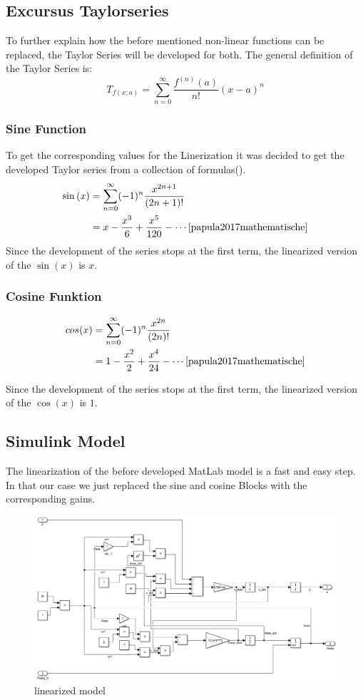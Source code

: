 \subsection{Excursus Taylorseries}
To further explain how the before mentioned non-linear functions can be replaced, the Taylor Series will be developed for both. The general definition of the Taylor Series is:
\begin{equation}
      T_{f(x;a)} = \sum^\infty_{n=0} \frac{f^{(n)}(a)}{n!}(x-a)^n
    \label{eq:Taylor_Series}  
\end{equation}
\subsubsection{Sine Function}
To get the corresponding values for the Linerization it was decided to get the developed Taylor series from a collection of formulas(\cite{papula2017mathematische}).
\begin{align}
    \sin \,(x)&=\sum _{n=0}^{\infty }(-1)^{n}{\frac {x^{2n+1}}{(2n+1)!}} \\
    &=x-{\frac {x^{3}}{6}}+{\frac {x^{5}}{120}}-\cdots \cite[p. 187]{papula2017mathematische}
\end{align}
Since the development of the series stops at the first term, the linearized version of the $\sin(x)$ is $x$.
\subsubsection{Cosine Funktion}
\begin{align}
    cos(x)&=\sum _{n=0}^{\infty }(-1)^{n}{\frac {x^{2n}}{(2n)!}}\\
    &=1-{\frac {x^{2}}{2}}+{\frac {x^{4}}{24}}-\cdots  \cite[p. 187]{papula2017mathematische}
\end{align}

Since the development of the series stops at the first term, the linearized version of the $\cos(x)$ is $1$.
\subsection{Simulink Model}
The linearization of the before developed MatLab model is a fast and easy step. In that our case we just replaced the sine and cosine Blocks with the corresponding gains. 
\begin{figure}[H]
    \centering
    \includegraphics[width=\textwidth]{Lab_report/pics/modelBuilding/linearized_model.PNG}
    \caption{linearized model}
    \label{fig:lin_model}
\end{figure}
